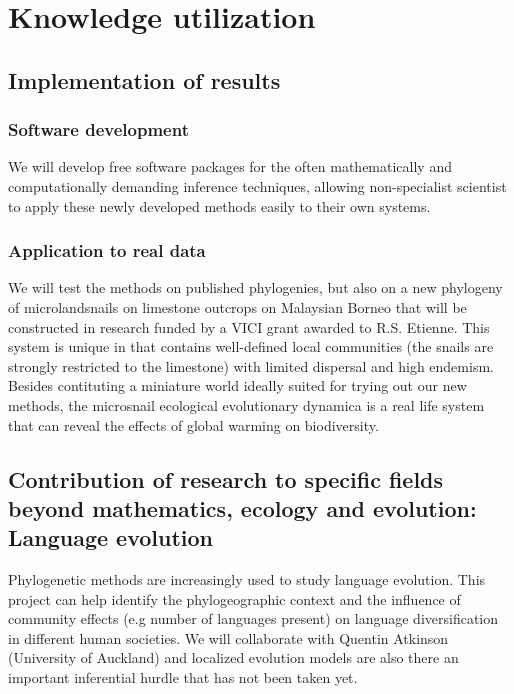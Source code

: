 \chapter{Knowledge utilization}




\section{Implementation of results}


\subsection{Software development}
We will develop free software packages for the often mathematically and computationally demanding inference techniques, allowing non-specialist scientist to apply these newly developed methods easily to their own systems.


\subsection{Application to real data}

We will test the methods on published phylogenies, but also on a new phylogeny of microlandsnails on limestone outcrops on Malaysian Borneo that will be constructed in research funded by a VICI grant awarded to R.S. Etienne. This system is unique in that contains well-defined local communities (the snails are strongly restricted to the limestone) with limited dispersal and high endemism. Besides contituting a miniature world ideally suited for trying out our new methods, the microsnail ecological evolutionary dynamica is a real life system that can reveal the effects of global warming on biodiversity.

\section{Contribution of research to specific fields beyond mathematics, ecology and evolution: Language evolution}

Phylogenetic methods are increasingly used to study language evolution. This project can help identify the phylogeographic context and the influence of community effects (e.g number of languages present) on language diversification in different human societies. We will collaborate with Quentin Atkinson (University of Auckland) and localized evolution models are also there an important inferential hurdle that has not been taken yet.

